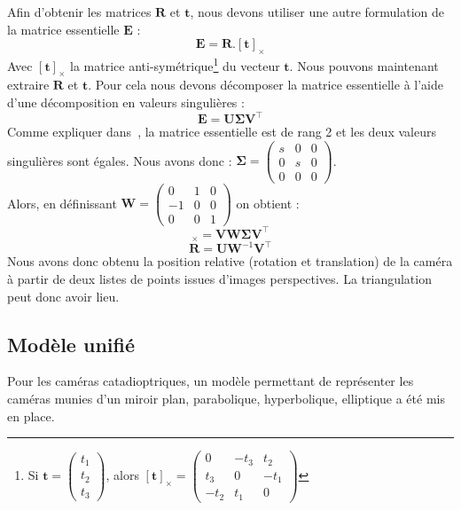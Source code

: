 Afin d'obtenir les matrices $\mathbf{R}$ et $\mathbf{t}$, nous devons utiliser une autre formulation de la matrice essentielle $\mathbf{E}$ :
\begin{equation}
\mathbf{E} = \mathbf{R} . [\mathbf{t}]_\times
\end{equation}
Avec $[\mathbf{t}]_\times$ la matrice anti-symétrique\footnote{Si $\mathbf{t}=\begin{pmatrix}t_1\\t_2\\t_3\end{pmatrix}$, alors $[\mathbf{t}]_\times=\begin{pmatrix}0&-t_3&t_2\\t_3&0&-t_1\\-t_2&t_1&0\end{pmatrix}$} du vecteur $\mathbf{t}$.
Nous pouvons maintenant extraire $\mathbf{R}$ et $\mathbf{t}$. Pour cela nous devons décomposer la matrice essentielle  à l'aide d'une décomposition en valeurs singulières :
$$\mathbf{E}=\mathbf{U} \mathbf{\Sigma} \mathbf{V}^{\top}$$
Comme expliquer dans~\cite{Hartley03Book}, la matrice essentielle est de rang 2 et les deux valeurs singulières sont égales.
Nous avons donc : $\mathbf{\Sigma} = \begin{pmatrix}s&0&0\\0&s&0\\0&0&0\end{pmatrix}$.\\
Alors, en définissant   $\mathbf{W}=\begin{pmatrix}0&1&0\\-1&0&0\\0&0&1\end{pmatrix}$ on obtient :
\begin{equation}
[\mathbf{t}]_\times = \mathbf{V} \mathbf{W} \mathbf{\Sigma} \mathbf{V}^{\top}
\end{equation}
\begin{equation}
\mathbf{R} = \mathbf{U} \mathbf{W}^{-1} \mathbf{V}^{\top}
\end{equation}
Nous avons donc obtenu la position relative (rotation et translation) de la caméra à partir de deux listes de points issues d'images perspectives.
La triangulation peut donc avoir lieu.


\subsection{Modèle unifié}

Pour les caméras catadioptriques, un modèle permettant de représenter les caméras munies d'un miroir plan, parabolique, hyperbolique, elliptique a été mis en place.

